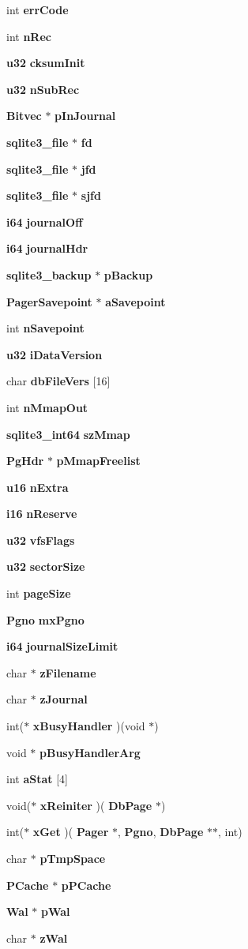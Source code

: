 \begin{DoxyCompactItemize}
\item 
int \textbf{ err\+Code}
\item 
int \textbf{ n\+Rec}
\item 
\textbf{ u32} \textbf{ cksum\+Init}
\item 
\textbf{ u32} \textbf{ n\+Sub\+Rec}
\item 
\textbf{ Bitvec} $\ast$ \textbf{ p\+In\+Journal}
\item 
\textbf{ sqlite3\+\_\+file} $\ast$ \textbf{ fd}
\item 
\textbf{ sqlite3\+\_\+file} $\ast$ \textbf{ jfd}
\item 
\textbf{ sqlite3\+\_\+file} $\ast$ \textbf{ sjfd}
\item 
\textbf{ i64} \textbf{ journal\+Off}
\item 
\textbf{ i64} \textbf{ journal\+Hdr}
\item 
\textbf{ sqlite3\+\_\+backup} $\ast$ \textbf{ p\+Backup}
\item 
\textbf{ Pager\+Savepoint} $\ast$ \textbf{ a\+Savepoint}
\item 
int \textbf{ n\+Savepoint}
\item 
\textbf{ u32} \textbf{ i\+Data\+Version}
\item 
char \textbf{ db\+File\+Vers} [16]
\item 
int \textbf{ n\+Mmap\+Out}
\item 
\textbf{ sqlite3\+\_\+int64} \textbf{ sz\+Mmap}
\item 
\textbf{ Pg\+Hdr} $\ast$ \textbf{ p\+Mmap\+Freelist}
\item 
\textbf{ u16} \textbf{ n\+Extra}
\item 
\textbf{ i16} \textbf{ n\+Reserve}
\item 
\textbf{ u32} \textbf{ vfs\+Flags}
\item 
\textbf{ u32} \textbf{ sector\+Size}
\item 
int \textbf{ page\+Size}
\item 
\textbf{ Pgno} \textbf{ mx\+Pgno}
\item 
\textbf{ i64} \textbf{ journal\+Size\+Limit}
\item 
char $\ast$ \textbf{ z\+Filename}
\item 
char $\ast$ \textbf{ z\+Journal}
\item 
int($\ast$ \textbf{ x\+Busy\+Handler} )(void $\ast$)
\item 
void $\ast$ \textbf{ p\+Busy\+Handler\+Arg}
\item 
int \textbf{ a\+Stat} [4]
\item 
void($\ast$ \textbf{ x\+Reiniter} )(\textbf{ Db\+Page} $\ast$)
\item 
int($\ast$ \textbf{ x\+Get} )(\textbf{ Pager} $\ast$, \textbf{ Pgno}, \textbf{ Db\+Page} $\ast$$\ast$, int)
\item 
char $\ast$ \textbf{ p\+Tmp\+Space}
\item 
\textbf{ P\+Cache} $\ast$ \textbf{ p\+P\+Cache}
\item 
\textbf{ Wal} $\ast$ \textbf{ p\+Wal}
\item 
char $\ast$ \textbf{ z\+Wal}
\end{DoxyCompactItemize}


